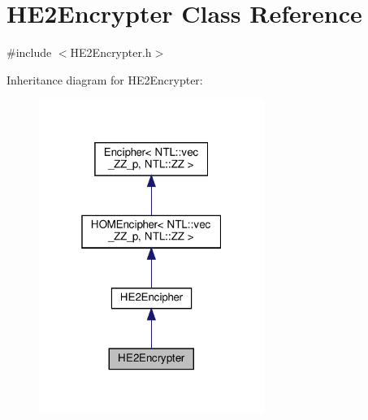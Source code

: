 \hypertarget{classHE2Encrypter}{}\section{H\+E2\+Encrypter Class Reference}
\label{classHE2Encrypter}


{\ttfamily \#include $<$H\+E2\+Encrypter.\+h$>$}



Inheritance diagram for H\+E2\+Encrypter\+:
\nopagebreak
\begin{figure}[H]
\begin{center}
\leavevmode
\includegraphics[width=208pt]{classHE2Encrypter__inherit__graph}
\end{center}
\end{figure}


